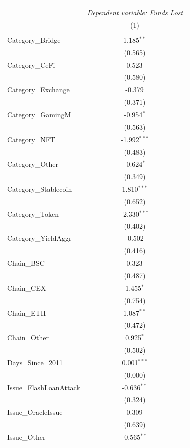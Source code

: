 \begin{table}[!htbp] \centering
\begin{tabular}{@{\extracolsep{5pt}}lc}
\\[-1.8ex]\hline
\hline \\[-1.8ex]
& \multicolumn{1}{c}{\textit{Dependent variable: Funds Lost}} \
\cr \cline{2-2}
\\[-1.8ex] & (1) \\
\hline \\[-1.8ex]
 Category_Bridge & 1.185$^{**}$ \\
& (0.565) \\
 Category_CeFi & 0.523$^{}$ \\
& (0.580) \\
 Category_Exchange & -0.379$^{}$ \\
& (0.371) \\
 Category_GamingM & -0.954$^{*}$ \\
& (0.563) \\
 Category_NFT & -1.992$^{***}$ \\
& (0.483) \\
 Category_Other & -0.624$^{*}$ \\
& (0.349) \\
 Category_Stablecoin & 1.810$^{***}$ \\
& (0.652) \\
 Category_Token & -2.330$^{***}$ \\
& (0.402) \\
 Category_YieldAggr & -0.502$^{}$ \\
& (0.416) \\
 Chain_BSC & 0.323$^{}$ \\
& (0.487) \\
 Chain_CEX & 1.455$^{*}$ \\
& (0.754) \\
 Chain_ETH & 1.087$^{**}$ \\
& (0.472) \\
 Chain_Other & 0.925$^{*}$ \\
& (0.502) \\
 Days_Since_2011 & 0.001$^{***}$ \\
& (0.000) \\
 Issue_FlashLoanAttack & -0.636$^{**}$ \\
& (0.324) \\
 Issue_OracleIssue & 0.309$^{}$ \\
& (0.639) \\
 Issue_Other & -0.565$^{**}$ \\

\end{tabular}
\end{table}
